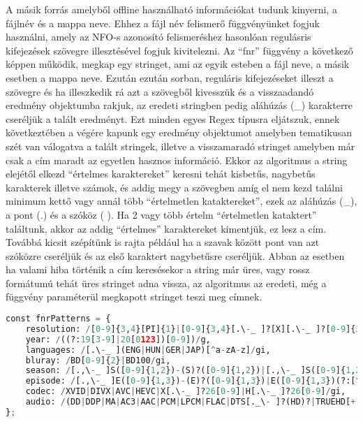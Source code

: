 A másik forrás amelyből offline használható információkat tudunk kinyerni, a fájlnév és a mappa neve. Ehhez a fájl név felismerő függvényünket fogjuk használni, amely az NFO-s azonosító felismeréshez hasonlóan regulásris kifejezések szövegre illesztésével fogjuk kivitelezni.
Az ``fnr'' függvény a következő képpen működik, megkap egy stringet, ami az egyik esteben a fájl neve, a másik esetben a mappa neve. Ezután ezután sorban, reguláris kifejezéseket illeszt a szövegre és ha illeszkedik rá azt a szövegből kivesszük és a visszaadandó eredmény objektumba rakjuk, az eredeti stringben pedig aláhúzás (\_) karakterre cseréljük a talált eredményt. Ezt minden egyes Regex típusra eljátszuk, ennek következtében a végére kapunk egy eredmény objektumot amelyben tematikusan szét van válogatva a talált stringek, illetve a visszamaradó stringet amelyben már csak a cím maradt az egyetlen hasznos információ. Ekkor az algoritmus a string elejétől elkezd ``értelmes karaktereket'' keresni tehát kisbetűs, nagybetűs karakterek illetve számok, és addig megy a szövegben amíg el nem kezd találni minimum kettő vagy annál több ``értelmetlen kataktereket'', ezek az aláhúzás (\_), a pont (.) és a szóköz ( ). Ha 2 vagy több értelm ``értelmetlen kataktert'' találtunk, akkor az addig ``értelmes'' karaktereket kimentjük, ez lesz a cím. Továbbá kicsit szépítünk is rajta például ha a szavak között pont van azt szóközre cseréljük és az első karaktert nagybetűsre cseréljük. Abban az esetben ha valami hiba történik a cím keresésekor a string már üres, vagy rossz formátumú tehát üres stringet adna vissza, az algoritmus az eredeti, még a függvény paraméterül megkapott stringet teszi meg címnek.

\begin{lstlisting}[language={python}]
const fnrPatterns = {
    resolution: /[0-9]{3,4}[PI]{1}|[0-9]{3,4}[.\-_ ]?[X][.\-_ ]?[0-9]{3,4}/gi,
    year: /((?:19[3-9]|20[0123])[0-9])/g,
    languages: /[.\-_ ](ENG|HUN|GER|JAP)[^a-zA-z]/gi,
    bluray: /BD[0-9]{2}|BD100/gi,
    season: /[.,\-_ ]S([0-9]{1,2})-(S)?([0-9]{1,2})|[.,\-_ ]S([0-9]{1,2})|[^0-9]([0-9]{1,2})X/gi,
    episode: /[.,\-_ ]E([0-9]{1,3})-(E)?([0-9]{1,3})|E([0-9]{1,3})(?:[^0-9]|$)|[Xx]([0-9]{1,3})(?:[^0-9]|$)|(EP|EPISODE)([0-9]{1,3})(?:[^0-9]|$)/gi,
    codec: /XVID|DIVX|AVC|HEVC|X[.\-_ ]?26[0-9]|H[.\-_ ]?26[0-9]/gi,
    audio: /(DD|DDP|MA|AC3|AAC|PCM|LPCM|FLAC|DTS[._\- ]?(HD)?|TRUEHD[+._\- ]?ATMOS|TRUEHD|ATMOS)[+._\- ]?[0-9]\.?[0-9]|DTS[._\- ]?(HD|ES)?|DUAL[._\- ]?AUDIO|DOLBY[+._\- ]?(DIGITAL[+._\- ]?(PLUS)?|VISION|ATMOS)|HALF-OU/gi,
};
\end{lstlisting}

